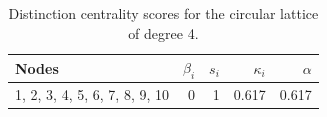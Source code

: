 \begin{table}
\centering
\caption{\label{tab:circularlattice}Distinction centrality scores for the circular lattice of degree 4.}
\centering
\begin{tabular}[t]{lrrrr}
\toprule
Nodes & $\beta_i$ & $s_i$ & $\kappa_i$ & $\alpha$\\
\midrule
1, 2, 3, 4, 5, 6, 7, 8, 9, 10 & 0 & 1 & 0.617 & 0.617\\
\bottomrule
\end{tabular}
\end{table}
